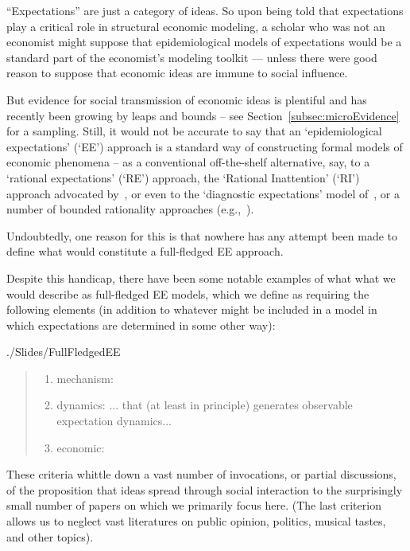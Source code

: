 ``Expectations'' are just a category of ideas.  So upon being told that expectations play a critical role in structural economic modeling, a scholar who was not an economist might suppose that epidemiological models of  expectations would be a standard part of the economist's modeling toolkit --- unless there were good reason to suppose that economic ideas are immune to social influence.

But evidence for social transmission of economic ideas is plentiful and has recently been growing by leaps and bounds -- see Section~\ref{subsec:microEvidence} for a sampling.  Still, it would not be accurate to say that an `epidemiological expectations' (`EE') approach is a standard way of constructing formal models of economic phenomena -- as a conventional off-the-shelf alternative, say, to a `rational expectations' (`RE') approach, the `Rational Inattention' (`RI') approach advocated by~\cite{sims2003implications}, or even to the `diagnostic expectations' model of~\cite{bordalo2018diagnostic}, or a number of bounded rationality approaches (e.g.,~\cite{gabaix2020behavioral}).

Undoubtedly, one reason for this is that nowhere has any attempt been made to define what would constitute a full-fledged EE approach.

Despite this handicap, there have been some notable examples of what what we would describe as full-fledged EE models, which we define as requiring the following elements (in addition to whatever might be included in a model in which expectations are determined in some other way):
\begin{verbatimwrite}{./Slides/FullFledgedEE}
\begin{quote}\normalfont
\begin{enumerate}
\item mechanism: 
\item dynamics: 
{... that (at least in principle) generates observable expectation dynamics...}
\item economic: 
  \end{enumerate}
\end{quote}
\end{verbatimwrite}

  These criteria whittle down a vast number of invocations, or partial discussions, of the proposition that ideas spread through social interaction to the surprisingly small number of papers on which we primarily focus here.  (The last criterion allows us to neglect vast literatures on public opinion, politics, musical tastes, and other topics).

